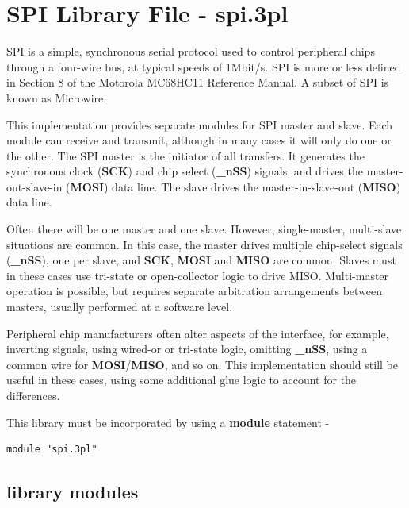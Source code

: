 \pagebreak

\section{SPI Library File - spi.3pl}

    SPI is a simple, synchronous serial protocol used to control peripheral
    chips through a four-wire bus, at typical speeds of 1Mbit/s. SPI is more
    or less defined in Section 8 of the Motorola MC68HC11 Reference Manual.
    A subset of SPI is known as Microwire.

    This implementation provides separate modules for SPI master and slave. Each
    module can receive and transmit, although in many cases it will only do one or
    the other. The SPI master is the initiator of all transfers. It generates the
    synchronous clock ({\bf SCK}) and chip select ({\bf \_nSS}) signals, and drives
    the master-out-slave-in ({\bf MOSI}) data line. The slave drives the
    master-in-slave-out ({\bf MISO}) data line. 

    Often there will be one master and one slave. However, single-master,
    multi-slave situations are common. In this case, the master drives multiple
    chip-select signals ({\bf \_nSS}), one per slave, and {\bf SCK}, {\bf MOSI} and
    {\bf MISO} are common. Slaves must in these cases use tri-state or
    open-collector logic to drive MISO. Multi-master operation is possible, but
    requires separate arbitration arrangements between masters, usually performed
    at a software level.

    Peripheral chip manufacturers often alter aspects of the interface, for
    example, inverting signals, using wired-or or tri-state logic, omitting {\bf
    \_nSS}, using a common wire for {\bf MOSI}/{\bf MISO}, and so on. This
    implementation should still be useful in these cases, using some additional
    glue logic  to account for the differences.
    
    This library must be incorporated by using a {\bf module} statement -
    \begin{lstlisting}[gobble=4, language=threepl]
       module "spi.3pl"
    \end{lstlisting}
    


    \subsection{library modules}


